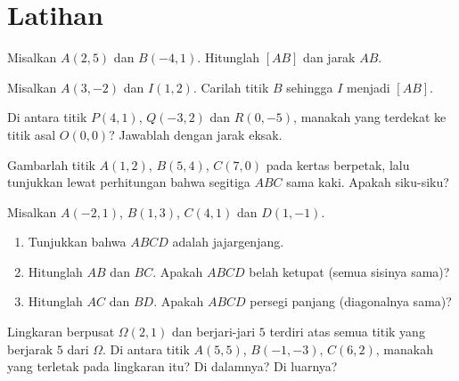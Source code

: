 \section{Latihan}

\begin{exercise}[$\star$]\label{exo:g10:coordgeom:1}
Misalkan $A(2, 5)$ dan $B(-4, 1)$. Hitunglah  
$[AB]$ dan jarak $AB$.
\end{exercise}

\begin{exercise}[$\star$]\label{exo:g10:coordgeom:2}
Misalkan $A(3, -2)$ dan $I(1, 2)$. Carilah  titik $B$ sehingga
$I$ menjadi  $[AB]$.
\end{exercise}

\begin{exercise}[$\star$]\label{exo:g10:coordgeom:3}
Di antara titik $P(4, 1)$, $Q(-3, 2)$ dan $R(0, -5)$, manakah yang terdekat
ke titik asal $O(0,0)$? Jawablah dengan jarak eksak.
\end{exercise}

\begin{exercise}[$\star$]\label{exo:g10:coordgeom:4}
Gambarlah titik $A(1, 2)$, $B(5, 4)$, $C(7, 0)$ pada kertas berpetak, lalu
tunjukkan lewat perhitungan bahwa segitiga $ABC$ sama kaki. Apakah siku-siku?
\end{exercise}

\begin{exercise}[$\star\star$]\label{exo:g10:coordgeom:5}
Misalkan $A(-2, 1)$, $B(1, 3)$, $C(4, 1)$ dan $D(1, -1)$.
\begin{enumerate}
  \item Tunjukkan bahwa $ABCD$ adalah jajargenjang.
  \item Hitunglah $AB$ dan $BC$. Apakah $ABCD$ belah ketupat (semua sisinya sama)?
  \item Hitunglah $AC$ dan $BD$. Apakah $ABCD$ persegi panjang (diagonalnya sama)?
\end{enumerate}
\end{exercise}

\begin{exercise}[$\star\star$]\label{exo:g10:coordgeom:6}
Lingkaran berpusat $\Omega(2, 1)$ dan berjari-jari $5$ terdiri atas semua
titik yang berjarak $5$ dari $\Omega$. Di antara titik $A(5, 5)$,
$B(-1, -3)$, $C(6, 2)$, manakah yang terletak pada lingkaran itu? Di dalamnya? Di luarnya?
\end{exercise}

